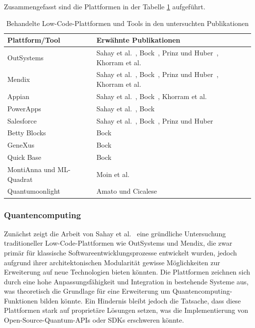 Zusammengefasst sind die Plattformen in der Tabelle \ref{tab:low-code-platforms} aufgeführt.

\begin{table}[h]
    \centering
    \begin{tabular}{|p{5cm}|p{9cm}|}
    \hline
    \textbf{Plattform/Tool} & \textbf{Erwähnte Publikationen} \\ \hline
    OutSystems              & Sahay et al.~\cite{Sahay_2020}, Bock~\cite{Bock_2021_essence}, Prinz und Huber~\cite{Prinz_2021}, Khorram et al.~\cite{Khorram_2020} \\ \hline
    Mendix                  & Sahay et al.~\cite{Sahay_2020}, Bock~\cite{Bock_2021_essence}, Prinz und Huber~\cite{Prinz_2021}, Khorram et al.~\cite{Khorram_2020} \\ \hline
    Appian                  & Sahay et al.~\cite{Sahay_2020}, Bock~\cite{Bock_2021_essence}, Khorram et al.~\cite{Khorram_2020} \\ \hline
    PowerApps               & Sahay et al.~\cite{Sahay_2020}, Bock~\cite{Bock_2021_essence} \\ \hline
    Salesforce              & Sahay et al.~\cite{Sahay_2020}, Bock~\cite{Bock_2021_essence}, Prinz und Huber~\cite{Prinz_2021} \\ \hline
    Betty Blocks            & Bock~\cite{Bock_2021_essence} \\ \hline
    GeneXus                 & Bock~\cite{Bock_2021_essence} \\ \hline
    Quick Base              & Bock~\cite{Bock_2021_essence} \\ \hline
    MontiAnna und ML-Quadrat & Moin et al.~\cite{Moin_2023} \\ \hline
    Quantumoonlight         & Amato und Cicalese~\cite{Amato_2023} \\ \hline
    \end{tabular}
    \caption{Behandelte Low-Code-Plattformen und Tools in den untersuchten Publikationen}
    \label{tab:low-code-platforms}
\end{table}

\subsubsection{Quantencomputing}
Zunächst zeigt die Arbeit von Sahay et al.~\cite{Sahay_2020} eine gründliche Untersuchung traditioneller Low-Code-Plattformen wie 
OutSystems und Mendix, die zwar primär für klassische Softwareentwicklungsprozesse entwickelt wurden, jedoch aufgrund ihrer 
architektonischen Modularität gewisse Möglichkeiten zur Erweiterung auf neue Technologien bieten könnten. Die Plattformen 
zeichnen sich durch eine hohe Anpassungsfähigkeit und Integration in bestehende Systeme aus, was theoretisch die Grundlage 
für eine Erweiterung um Quantencomputing-Funktionen bilden könnte. Ein Hindernis bleibt jedoch die Tatsache, dass diese 
Plattformen stark auf proprietäre Lösungen setzen, was die Implementierung von Open-Source-Quantum-APIs oder SDKs erschweren könnte.

